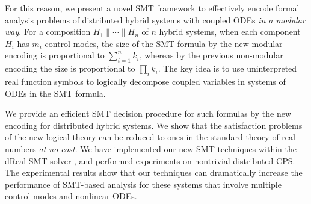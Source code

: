 For this reason, 
we present a novel SMT framework
to  effectively encode formal analysis problems
of distributed hybrid systems with coupled ODEs \emph{in a modular way}.
%
For a composition $H_1 \parallel \cdots \parallel H_n$ of $n$ hybrid systems,
when each component $H_i$ has $m_i$ control modes,
the size of the SMT formula by the new modular encoding is proportional to $\sum_{i=1}^n k_i$,
whereas by the previous non-modular encoding the size is proportional to $\prod_i k_i$.
%
The key idea is to use uninterpreted real function symbols %
to logically decompose coupled variables in systems of ODEs in the SMT formula.

We provide an efficient SMT decision procedure for such formulas by the new encoding
for distributed hybrid systems.
We show that 
the satisfaction problems of the new logical theory 
can be reduced to ones in the standard theory of real numbers \emph{at no cost}.
%
We have implemented our new SMT techniques within the \textsf{dReal} SMT solver \cite{dReal},
and performed experiments on nontrivial distributed CPS.
The experimental results show that our techniques can dramatically increase 
the performance of SMT-based analysis for these systems
that involve multiple control modes and nonlinear ODEs.

%


%


